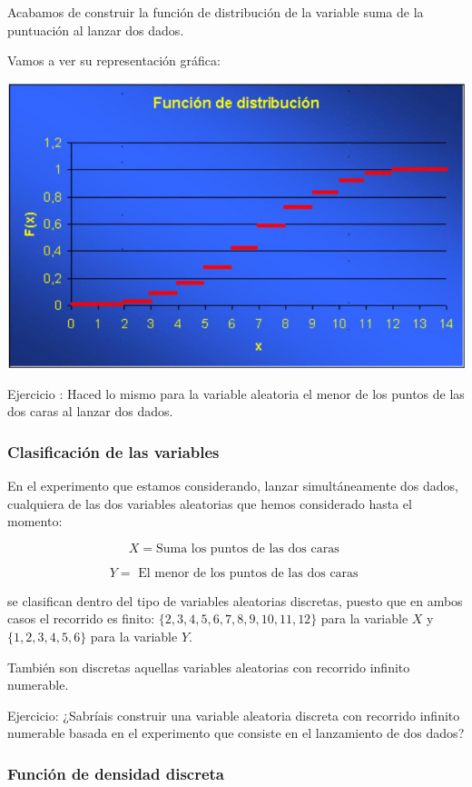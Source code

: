 \documentclass[
]{article}
\begin{document}
Acabamos de construir la función de distribución de la variable suma de
la puntuación al lanzar dos dados.

Vamos a ver su representación gráfica:

\includegraphics[width=0.9\linewidth]{images/clipboard-1894572766}

Ejercicio : Haced lo mismo para la variable aleatoria el menor de los
puntos de las dos caras al lanzar dos dados.

\subsubsection{Clasificación de las variables}\label{clasificaciuxf3n-de-las-variables}

En el experimento que estamos considerando, lanzar simultáneamente dos
dados, cualquiera de las dos variables aleatorias que hemos considerado
hasta el momento:

\[ X=\text {Suma los puntos de las dos caras } \]

\[
Y=\text { El menor de los puntos de las dos caras }
\]

se clasifican dentro del tipo de variables aleatorias discretas, puesto
que en ambos casos el recorrido es finito:
\(\{2,3,4,5,6,7,8,9,10,11, 12\}\) para la variable \(X\) y
\(\{1,2,3,4,5, 6\}\) para la variable \(Y\).

También son discretas aquellas variables aleatorias con recorrido
infinito numerable.

Ejercicio: ¿Sabríais construir una variable aleatoria discreta con
recorrido infinito numerable basada en el experimento que consiste en el
lanzamiento de dos dados?

\subsubsection{Función de densidad discreta}\label{funciuxf3n-de-densidad-discreta}
\end{document}
